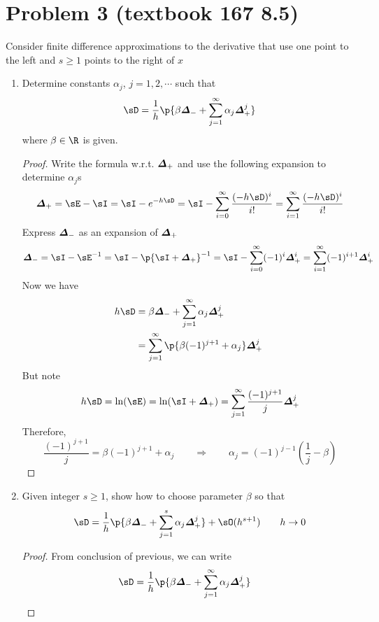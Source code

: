 \documentclass[11pt]{article}
\begin{document}
\section*{Problem 3 (textbook 167 8.5)}
Consider finite difference approximations to the derivative that use one point to the left and $s\geq 1$ points to the right of $x$
\begin{enumerate}
    \item Determine constants $\alpha_j$, $j=1,2,\cdots$ such that
    \[  
        \diff = \frac{1}{h} \p{
            \beta \back + \sum_{j=1}^{\infty} \alpha_j \forw^j
        }
    \]
    where $\beta \in\R$ is given.
    \begin{proof}
        Write the formula w.r.t. $\boldsymbol{\varDelta}_+$ and use the following expansion to determine $\alpha_j$s
        \[
            \forw = \shift - \id = \id - e^{-h\diff}
            = \id - \sum_{i=0}^{\infty} \frac{(-h\diff)^i}{i!}
            = \sum_{i=1}^{\infty} \frac{(-h\diff)^i}{i!}
        \]
        Express $\boldsymbol{\varDelta}_-$ as an expansion of $\boldsymbol{\varDelta}_+$
        \[
            \back 
            = \id - \shift^{-1}
            = \id - \p{\id + \forw}^{-1}
            = \id - \sum_{i=0}^{\infty} (-1)^{i} \forw^i
            = \sum_{i=1}^{\infty} (-1)^{i+1} \forw^i
        \]
        Now we have 
        \begin{align*}
            h\diff 
                &= \beta \back + \sum_{j=1}^{\infty} \alpha_j \forw^j \\
                &= \sum_{j=1}^{\infty} \p{\beta(-1)^{j+1} + \alpha_j} \forw^j \
        \end{align*}
        But note
        \[
            h\diff 
            = \ln (\shift) 
            = \ln (\id + \forw)
            = \sum_{j=1}^{\infty} \frac{(-1)^{j+1}}{j} \forw^j
        \]
        Therefore,
        \[
            \frac{(-1)^{j+1}}{j} = \beta(-1)^{j+1} + \alpha_j
            \quad \quad \Rightarrow \quad \quad
            \alpha_j = (-1)^{j-1} (\frac{1}{j} - \beta)
        \]
    \end{proof}
    \item Given integer $s\geq 1$, show how to choose parameter $\beta$ so that 
    \[
        \diff = \frac{1}{h} \p{
            \beta \back + \sum_{j=1}^{s} \alpha_j \forw^j
        } + \sO(h^{s+1})
        \quad \quad h\to 0
    \]
    \begin{proof}
        From conclusion of previous, we can write 
        \begin{align*}
            \diff 
                &= \frac{1}{h} \p{
                    \beta \back + \sum_{j=1}^{\infty} \alpha_j \forw^j
}
\end{align*}
\end{proof}
\end{enumerate}
\end{document}
